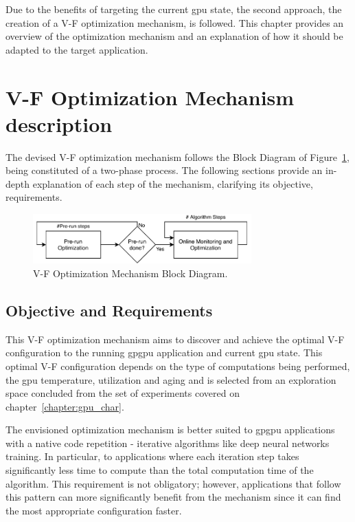 Due to the benefits of targeting the current \acrshort{gpu} state, the second approach, the creation of a V-F optimization mechanism, is followed. This chapter provides an overview of the optimization mechanism and an explanation of how it should be adapted to the target application.





\section{V-F Optimization Mechanism description}
\label{section:opt}

The devised V-F optimization mechanism follows the Block Diagram of Figure~\ref{fig:opt_mech}, being constituted of a two-phase process. The following sections provide an in-depth explanation of each step of the mechanism, clarifying its objective, requirements.

\begin{figure}[htb]
  \centering
  \includegraphics[width=0.75\textwidth]{Figures/Optimization/full_mech.pdf}
  \caption{V-F Optimization Mechanism Block Diagram.}
  \label{fig:opt_mech}
\end{figure}

\subsection{Objective and Requirements}

This V-F optimization mechanism aims to discover and achieve the optimal V-F configuration to the running \acrshort{gpgpu} application and current \acrshort{gpu} state. This optimal V-F configuration depends on the type of computations being performed, the \acrshort{gpu} temperature, utilization and aging and is selected from an exploration space concluded from the set of experiments covered on chapter~\ref{chapter:gpu_char}. 

The envisioned optimization mechanism is better suited to \acrshort{gpgpu} applications with a native code repetition - iterative algorithms like deep neural networks training. In particular, to applications where each iteration step takes significantly less time to compute than the total computation time of the algorithm. This requirement is not obligatory; however, applications that follow this pattern can more significantly benefit from the mechanism since it can find the most appropriate configuration faster.


